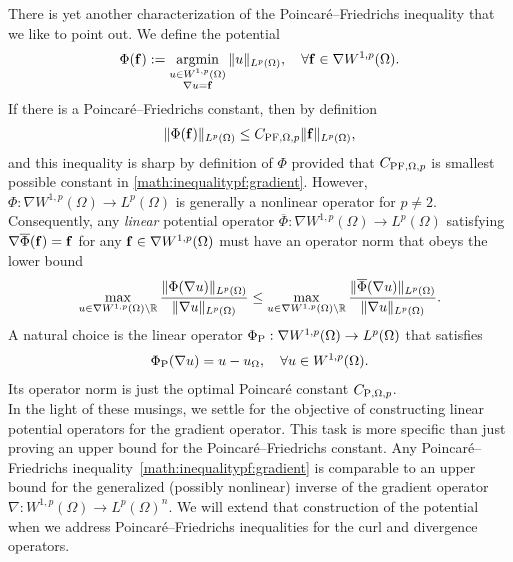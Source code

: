 \documentclass[10pt,letterpaper]{article}
\begin{document}
There is yet another characterization of the Poincar\'e--Friedrichs inequality that we like to point out. 
We define the potential 
\begin{align*}
    \Phi( {\mathbf f} ) := \operatorname*{{\rm argmin}}\limits_{ \substack{ u \in W^{1,p}(\Omega) \\ \nabla u = {\mathbf f} } } \| u \|_{L^{p}(\Omega)},
    \quad 
    \forall 
    {\mathbf f} \in \nabla W^{1,p}(\Omega)
    .
\end{align*}
If there is a Poincar\'e--Friedrichs constant, then by definition
\begin{align*}
    \| \Phi({\mathbf f}) \|_{L^{p}(\Omega)} \leq C_{{\rm PF},\Omega,p} \| {\mathbf f} \|_{L^{p}(\Omega)},
\end{align*}
and this inequality is sharp by definition of $\Phi$ provided that $C_{{\rm PF},\Omega,p}$ is smallest possible constant in \eqref{math:inequalitypf:gradient}. 
However, $\Phi : \nabla W^{1,p}(\Omega) \rightarrow L^{p}(\Omega)$ is generally a nonlinear operator for $p \neq 2$. 
Consequently, any \textit{linear} potential operator $\overline\Phi : \nabla W^{1,p}(\Omega) \rightarrow L^{p}(\Omega)$
satisfying $\nabla \overline\Phi( {\mathbf f} ) = {\mathbf f}$ for any ${\mathbf f} \in \nabla W^{1,p}(\Omega)$ must have an operator norm that obeys the lower bound 
\begin{align*}
    \max\limits_{ u \in \nabla W^{1,p}(\Omega) \setminus {\mathbb R} } 
    \frac{ \| \Phi(\nabla u) \|_{L^{p}(\Omega)} }{ \| \nabla u \|_{L^{p}(\Omega)} }
    \leq 
    \max\limits_{ u \in \nabla W^{1,p}(\Omega) \setminus {\mathbb R} } 
    \frac{ \| \overline\Phi(\nabla u) \|_{L^{p}(\Omega)} }{ \| \nabla u \|_{L^{p}(\Omega)} }
    .
\end{align*}
A natural choice is the linear operator $\Phi_{{\rm P}} : \nabla W^{1,p}(\Omega) \rightarrow L^{p}(\Omega)$ that satisfies 
\begin{align*}
    \Phi_{{\rm P}}( \nabla u ) = u - u_{\Omega},
    \quad 
    \forall 
    u \in W^{1,p}(\Omega)
    .
\end{align*}
Its operator norm is just the optimal Poincar\'e constant $C_{{\rm P},\Omega,p}$.
\\

In the light of these musings, we settle for the objective of constructing linear potential operators for the gradient operator.
This task is more specific than just proving an upper bound for the Poincar\'e--Friedrichs constant. 
Any Poincar\'e--Friedrichs inequality~\eqref{math:inequalitypf:gradient} is comparable to an upper bound for the generalized (possibly nonlinear) inverse of the gradient operator $\nabla : W^{1,p}(\Omega) \rightarrow L^{p}(\Omega)^{n}$. 
We will extend that construction of the potential when we address Poincar\'e--Friedrichs inequalities for the curl and divergence operators. 
\end{document}
